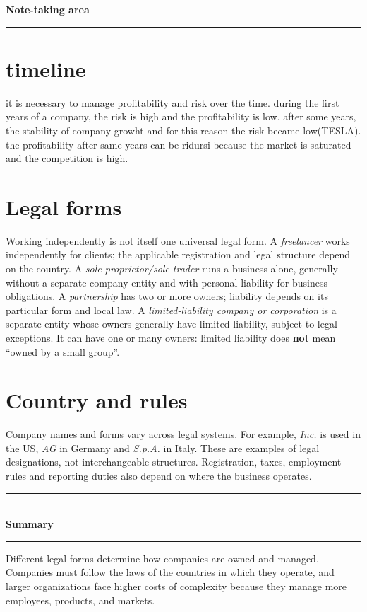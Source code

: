 \documentclass[12pt,a4paper]{report}
\begin{document}
\begin{minipage}[t]{0.69\textwidth}
    \textbf{Note-taking area}\\[0.5em]
    \rule{\linewidth}{0.4pt}
    
    \section{timeline}
    it is necessary to manage profitability and risk over the time.
    during the first years of a company, the risk is high and the profitability is low. after some years, the stability of company growht and for this reason the risk became low(TESLA).
    the profitability after same years can be ridursi because the market is saturated and the competition is high.
    \section{Legal forms} Working independently is not itself one universal legal form. A \emph{freelancer} works independently for clients; the applicable registration and legal structure depend on the country. A \emph{sole proprietor/sole trader} runs a business alone, generally without a separate company entity and with personal liability for business obligations. A \emph{partnership} has two or more owners; liability depends on its particular form and local law. A \emph{limited-liability company or corporation} is a separate entity whose owners generally have limited liability, subject to legal exceptions. It can have one or many owners: limited liability does \textbf{not} mean ``owned by a small group''.
    \section{Country and rules} Company names and forms vary across legal systems. For example, \emph{Inc.} is used in the US, \emph{AG} in Germany and \emph{S.p.A.} in Italy. These are examples of legal designations, not interchangeable structures. Registration, taxes, employment rules and reporting duties also depend on where the business operates.

\end{minipage}

\noindent\rule{\textwidth}{0.4pt}\\[0.5em]
\textbf{Summary}\\[0.5em]
    \rule{\linewidth}{0.4pt}
Different legal forms determine how companies are owned and managed. Companies must follow the laws of the countries in which they operate, and larger organizations face higher costs of complexity because they manage more employees, products, and markets.
 
\end{document}
